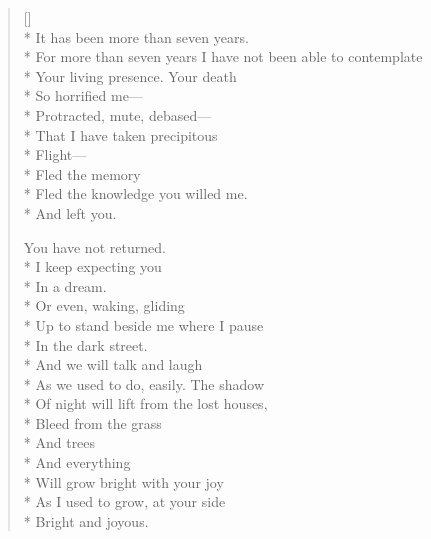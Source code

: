 \label{ch:the_nature_of_loss}
\settowidth{\versewidth}{For more than seven years I have not been able to contemplate}
\begin{verse}[\versewidth]
\\*
It has been more than seven years.\\*
For more than seven years I have not been able to contemplate\\*
Your living presence.   Your death\\*
So horrified me---\\*
Protracted, mute, debased---\\*
That I have taken precipitous \\*
Flight---\\*
Fled the memory\\*
Fled the knowledge you willed me.\\*
And left you.

You have not returned.\\*
I keep expecting you\\*
In a dream.\\*
Or even, waking, gliding\\*
Up to stand beside me where I pause\\*
In the dark street.\\*
And we will talk and laugh\\*
As we used to do, easily.  The shadow\\*
Of night will lift from the lost houses,\\*
Bleed from the grass\\*
And trees\\*
And everything\\*
Will grow bright with your joy \\*
As I used to grow, at your side\\*
Bright and joyous.
\end{verse}
